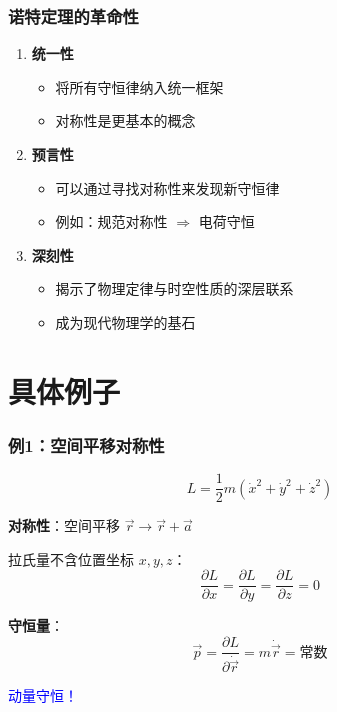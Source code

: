 \documentclass[xcolor=dvipsnames]{ctexbeamer}
\begin{document}
\begin{frame}
\frametitle{诺特定理的革命性}
\begin{enumerate}
\item \textbf{统一性}
\begin{itemize}
\item 将所有守恒律纳入统一框架
\item 对称性是更基本的概念
\end{itemize}

\pause

\item \textbf{预言性}
\begin{itemize}
\item 可以通过寻找对称性来发现新守恒律
\item 例如：规范对称性 $\Rightarrow$ 电荷守恒
\end{itemize}

\pause

\item \textbf{深刻性}
\begin{itemize}
\item 揭示了物理定律与时空性质的深层联系
\item 成为现代物理学的基石
\end{itemize}
\end{enumerate}
\end{frame}

\section{具体例子}

\begin{frame}
\frametitle{例1：空间平移对称性}
\begin{example}[自由粒子]
$$L = \frac{1}{2}m(\dot{x}^2 + \dot{y}^2 + \dot{z}^2)$$
\end{example}

\pause

\textbf{对称性}：空间平移 $\vec{r} \to \vec{r} + \vec{a}$

\pause

拉氏量不含位置坐标 $x, y, z$：
$$\frac{\partial L}{\partial x} = \frac{\partial L}{\partial y} = \frac{\partial L}{\partial z} = 0$$

\pause

\textbf{守恒量}：
$$\vec{p} = \frac{\partial L}{\partial \dot{\vec{r}}} = m\dot{\vec{r}} = \text{常数}$$

\textcolor{blue}{动量守恒！}
\end{frame}
\end{document}
